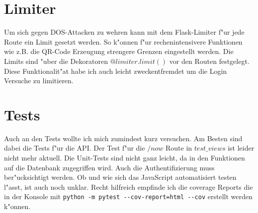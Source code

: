 \section{Limiter}\label{sec:limiter}
Um sich gegen DOS-Attacken zu wehren kann mit dem Flask-Limiter f{"u}r jede Route ein Limit gesetzt werden.
So k{"o}nnen f{"u}r rechenintensivere Funktionen wie z.B. die QR-Code Erzeugung strengere Grenzen eingestellt werden.
Die Limits sind {"u}ber die Dekoratoren $@limiter.limit()$ vor den Routen festgelegt.
Diese Funktionalit{"a}t habe ich auch leicht zweckentfremdet um die Login Versuche zu limitieren.

\section{Tests}\label{sec:tests}
\lstset{basicstyle=\selectfont\ttfamily}

Auch an den Tests wollte ich mich zumindest kurz versuchen.
Am Besten sind dabei die Tests f{"u}r die API.
Der Test f{"u}r die $/now$ Route in $test\_views$ ist leider nicht mehr aktuell.
Die Unit-Tests sind nicht ganz leicht, da in den Funktionen auf die Datenbank zugegriffen wird.
Auch die Authentifizierung muss ber{"u}cksichtigt werden.
Ob und wie sich das JavaScript automatisiert testen l{"a}sst, ist auch noch unklar.
Recht hilfreich empfinde ich die coverage Reports die in der Konsole mit \lstinline$python -m pytest --cov-report=html --cov$ erstellt werden k{"o}nnen.
